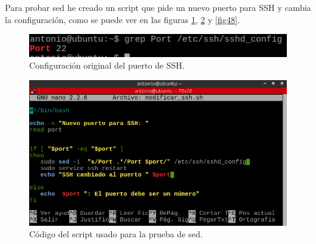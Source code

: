Para probar sed he creado un script que pide un nuevo puerto para SSH y cambia la configuración, como se puede ver en las figuras \ref{fig46}, \ref{fig47} y \ref{fig48}.\cite{sed}


\begin{figure}[H]
    \begin{center}
        \includegraphics[scale=0.8]{imagenes/img49}
        \caption{Configuración original del puerto de SSH.}
        \label{fig46}
    \end{center}
\end{figure}

\begin{figure}[H]
    \begin{center}
        \includegraphics[scale=0.65]{imagenes/img50}
        \caption{Código del script usado para la prueba de sed.}
        \label{fig47}
    \end{center}
\end{figure}


